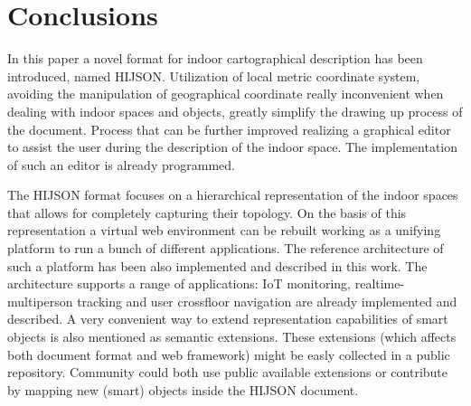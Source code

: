 \section{Conclusions}\label{conclusions}

In this paper a novel format for indoor cartographical description has been introduced, named HIJSON. Utilization of local metric coordinate system, avoiding the manipulation of geographical coordinate really inconvenient when dealing with indoor spaces and objects, greatly simplify the drawing up process of the document. Process that can be further improved realizing a graphical editor to assist the user during the description of the indoor space. The implementation of such an editor is already programmed.

The HIJSON format focuses on a hierarchical representation of the indoor spaces that allows for completely capturing their topology. On the basis of this representation a virtual web environment can be rebuilt working as a unifying platform to run a bunch of different applications. The reference architecture of such a platform has been also implemented and described in this work. The architecture supports a range of applications: IoT monitoring, realtime-multiperson tracking and user crossfloor navigation are already implemented and described. A very convenient way to extend representation capabilities of smart objects is also mentioned as semantic extensions. These extensions (which affects both document format and web framework) might be easly collected in a public repository. Community could both use public available extensions or contribute by mapping new (smart) objects inside the HIJSON document.
